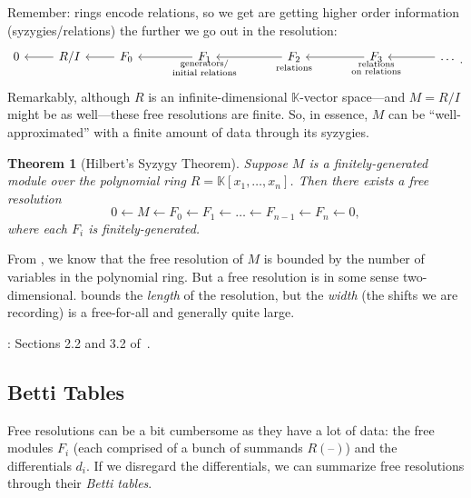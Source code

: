 \documentclass[12pt,a4paper]{article}
\newcommand{\KK}{\mathbb{K}}
\newtheorem{theorem}{Theorem}[section]
\theoremstyle{definition}
\numberwithin{equation}{section}
\begin{document}
Remember: rings encode relations, so we get are getting higher order information (syzygies/relations) the further we go out in the resolution:
\begin{equation*}
\begin{tikzcd}
    0 & R/I \arrow[l] & F_0 \arrow[l] & F_1 \arrow[l] & F_2 \arrow[l] & F_3 \arrow[l] & \dots \arrow[l] \\[-1cm]
    {} & {} & {} & \substack{\text{generators/} \\ \text{initial relations}} & \substack{\text{relations}} & \substack{\text{relations} \\ \text{on relations}} & {}
\end{tikzcd}.
\end{equation*}
Remarkably, although $R$ is an infinite-dimensional $\KK$-vector space---and $M = R/I$ might be as well---these free resolutions are finite.
So, in essence, $M$ can be ``well-approximated'' with a finite amount of data through its syzygies.

\begin{theorem}[Hilbert's Syzygy Theorem]
    \label{theorem:hilberts syzygy theorem}
    Suppose $M$ is a finitely-generated module over the polynomial ring $R = \KK[x_1,\dots,x_n]$.
    Then there exists a free resolution
    \begin{equation*}
        0 \leftarrow M \leftarrow F_0 \leftarrow F_1 \leftarrow \dots \leftarrow F_{n-1} \leftarrow F_n \leftarrow 0,
    \end{equation*}
    where each $F_i$ is finitely-generated.
\end{theorem}

From , we know that the free resolution of $M$ is bounded by the number of variables in the polynomial ring.
But a free resolution is in some sense two-dimensional.
 bounds the \emph{length} of the resolution, but the \emph{width} (the shifts we are recording) is a free-for-all and generally quite large.

\vspace*{1cm}

: Sections 2.2 and 3.2 of~\cite{schenck_computational_2003}.

\vspace*{1cm}


\subsection{Betti Tables}
Free resolutions can be a bit cumbersome as they have a lot of data: the free modules $F_i$ (each comprised of a bunch of summands $R(\text{--})$) and the differentials $d_i$.
If we disregard the differentials, we can summarize free resolutions through their \emph{Betti tables}.
\end{document}
